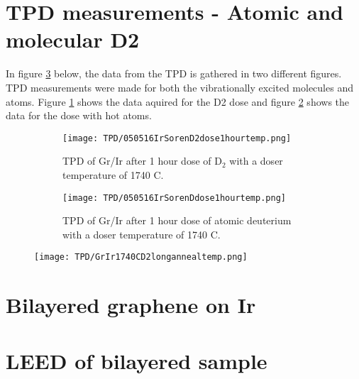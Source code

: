 \section{TPD measurements - Atomic and molecular D2}

In figure \ref{TPD:all} below, the data from the TPD is gathered in two different figures. TPD measurements were made for both the vibrationally excited molecules and atoms. Figure \ref{TPD:D2} shows the data aquired for the D2 dose and figure \ref{TPD:D} shows the data for the dose with hot atoms.

\begin{figure}[H]
  \centering
  \begin{subfigure}[b]{0.45\textwidth}
    \texttt{[image: TPD/050516IrSorenD2dose1hourtemp.png]}
    \caption{TPD of Gr/Ir after 1 hour dose of D$_2$ with a doser temperature of 1740 \degree C.}
    \label{TPD:D2}
  \end{subfigure}\hspace{0.5cm}
  \begin{subfigure}[b]{0.45\textwidth}
    \texttt{[image: TPD/050516IrSorenDdose1hourtemp.png]}
    \caption{TPD of Gr/Ir after 1 hour dose of atomic deuterium with a doser temperature of 1740 \degree C.}
    \label{TPD:D}
  \end{subfigure}
  \caption{}
  \label{TPD:all}
\end{figure}


\begin{figure}[H]
  \centering
  \texttt{[image: TPD/GrIr1740CD2longannealtemp.png]}
  \caption{}
  \label{TPD:bilayer}
\end{figure}
\section{Bilayered graphene on Ir}


\section{LEED of bilayered sample}

\begin{figure}[H]
\caption{}
\label{}
\end{figure}
